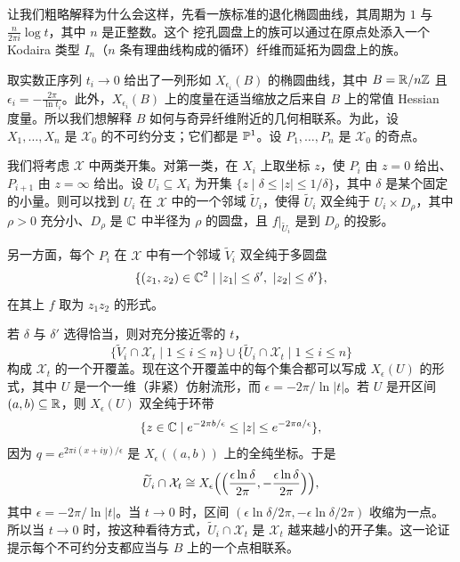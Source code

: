 让我们粗略解释为什么会这样，先看一族标准的退化椭圆曲线，其周期为 $1$ 与 $\frac{n}{2\pi i}\log t$，其中 $n$ 是正整数。这个
挖孔圆盘上的族可以通过在原点处添入一个 Kodaira 类型 $I_n$（$n$ 条有理曲线构成的循环）纤维而延拓为圆盘上的族。

取实数正序列 $t_i\to0$ 给出了一列形如 $X_{\epsilon_i}(B)$ 的椭圆曲线，其中 $B=\mathbb{R}/n\mathbb{Z}$ 且 $\epsilon_i=-\frac{2\pi}{\ln t_i}$。此外，$X_{\epsilon_i}(B)$ 上的度量在适当缩放之后来自 $B$ 上的常值 Hessian 度量。所以我们想解释 $B$ 如何与奇异纤维附近的几何相联系。为此，设 $X_1,\dots,X_n$ 是 $\mathcal{X}_0$ 的不可约分支；它们都是 $\mathbb{P}^1$。设 $P_1,\dots,P_n$ 是 $\mathcal{X}_0$ 的奇点。

我们将考虑 $\mathcal{X}$ 中两类开集。对第一类，在 $X_i$ 上取坐标 $z$，使 $P_i$ 由 $z=0$ 给出、$P_{i+1}$ 由 $z=\infty$ 给出。设 $U_i\subseteq X_i$ 为开集 $\{z\mid\delta\le|z|\le1/\delta\}$，其中 $\delta$ 是某个固定的小量。则可以找到 $U_i$ 在 $\mathcal{X}$ 中的一个邻域 $\widetilde{U}_i$，使得 $\widetilde{U}_i$ 双全纯于 $U_i\times D_\rho$，其中 $\rho>0$ 充分小、$D_\rho$ 是 $\mathbb{C}$ 中半径为 $\rho$ 的圆盘，且 $f|_{\widetilde{U}_i}$ 是到 $D_\rho$ 的投影。

另一方面，每个 $P_i$ 在 $\mathcal{X}$ 中有一个邻域 $\widetilde{V}_i$ 双全纯于多圆盘
\[
\{(z_1,z_2)\in\mathbb{C}^2\mid |z_1|\le\delta',\ |z_2|\le\delta'\},
\]
在其上 $f$ 取为 $z_1z_2$ 的形式。

若 $\delta$ 与 $\delta'$ 选得恰当，则对充分接近零的 $t$，
\[
\{\widetilde{V}_i\cap\mathcal{X}_t\mid1\le i\le n\}\cup\{\widetilde{U}_i\cap\mathcal{X}_t\mid1\le i\le n\}
\]
构成 $\mathcal{X}_t$ 的一个开覆盖。现在这个开覆盖中的每个集合都可以写成 $X_\epsilon(U)$ 的形式，其中 $U$ 是一个一维（非紧）仿射流形，而 $\epsilon=-2\pi/\ln|t|$。若 $U$ 是开区间 $(a,b)\subseteq\mathbb{R}$，则 $X_\epsilon(U)$ 双全纯于环带
\[
\{z\in\mathbb{C}\mid e^{-2\pi b/\epsilon}\le|z|\le e^{-2\pi a/\epsilon}\},
\]
因为 $q=e^{2\pi i(x+iy)/\epsilon}$ 是 $X_\epsilon((a,b))$ 上的全纯坐标。于是
\[
\widetilde{U}_i\cap\mathcal{X}_t\cong X_\epsilon\Bigl(\Bigl(\frac{\epsilon\ln\delta}{2\pi},-\frac{\epsilon\ln\delta}{2\pi}\Bigr)\Bigr),
\]
其中 $\epsilon=-2\pi/\ln|t|$。当 $t\to0$ 时，区间 $(\epsilon\ln\delta/2\pi,-\epsilon\ln\delta/2\pi)$ 收缩为一点。所以当 $t\to0$ 时，按这种看待方式，$\widetilde{U}_i\cap\mathcal{X}_t$ 是 $\mathcal{X}_t$ 越来越小的开子集。这一论证提示每个不可约分支都应当与 $B$ 上的一个点相联系。


